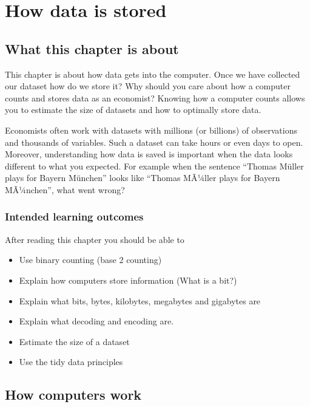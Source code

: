 \documentclass[
]{book}
\providecommand{\tightlist}{%
  \setlength{\itemsep}{0pt}\setlength{\parskip}{0pt}}
\begin{document}
\hypertarget{how-data-is-stored}{%
\chapter{How data is stored}\label{how-data-is-stored}}

\hypertarget{what-this-chapter-is-about-7}{%
\section{What this chapter is about}\label{what-this-chapter-is-about-7}}

This chapter is about how data gets into the computer. Once we have collected our dataset how do we store it? Why should you care about how a computer counts and stores data as an economist? Knowing how a computer counts allows you to estimate the size of datasets and how to optimally store data.

Economists often work with datasets with millions (or billions) of observations and thousands of variables. Such a dataset can take hours or even days to open. Moreover, understanding how data is saved is important when the data looks different to what you expected. For example when the sentence ``Thomas Müller plays for Bayern München'' looks like ``Thomas MÃ¼ller plays for Bayern MÃ¼nchen'', what went wrong?

\hypertarget{intended-learning-outcomes-7}{%
\subsection*{Intended learning outcomes}\label{intended-learning-outcomes-7}}

After reading this chapter you should be able to

\begin{itemize}
\tightlist
\item
  Use binary counting (base 2 counting)
\item
  Explain how computers store information (What is a bit?)
\item
  Explain what bits, bytes, kilobytes, megabytes and gigabytes are
\item
  Explain what decoding and encoding are.
\item
  Estimate the size of a dataset
\item
  Use the tidy data principles
\end{itemize}

\hypertarget{how-computers-work}{%
\section{How computers work}\label{how-computers-work}}
\end{document}
